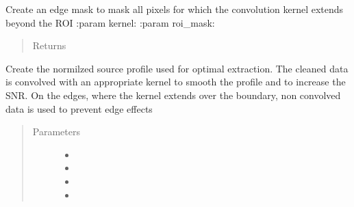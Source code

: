 \documentclass[a4paper,11pt,english]{sphinxmanual}
\begin{document}
\begin{fulllineitems}
\begin{fulllineitems}
\label{\detokenize{cascade.TSO:cascade.TSO.TSO.TSOSuite._create_edge_mask}}
Create an edge mask to mask all pixels for which the convolution kernel
extends beyond the ROI
:param kernel:
:param roi\_mask:
\begin{quote}\begin{description}
\item[{Returns}] \leavevmode
{}

\end{description}\end{quote}

\end{fulllineitems}


\begin{fulllineitems}
\label{\detokenize{cascade.TSO:cascade.TSO.TSO.TSOSuite._create_extraction_profile}}
Create the normilzed source profile used for optimal extraction.
The cleaned data is convolved with an appropriate kernel to smooth the
profile and to increase the SNR. On the edges, where the kernel extends
over the boundary, non convolved data is used to prevent edge effects
\begin{quote}\begin{description}
\item[{Parameters}] \leavevmode\begin{itemize}
\item {} 
 \textendash{} 

\item {} 
 \textendash{} 

\item {} 
 \textendash{} 

\item {} 
 \textendash{} 


\end{itemize}
\end{description}
\end{quote}
\end{fulllineitems}
\end{fulllineitems}
\end{document}
